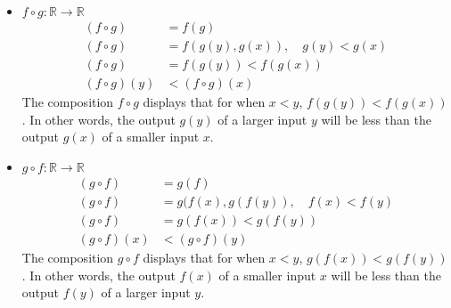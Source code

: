 \documentclass{article}
\begin{document}
\begin{itemize}
	\item $ f \circ g: \mathbb{R} \rightarrow \mathbb{R} $
	      \begin{align*}
		      \left( f \circ g \right)                  & = f(g)                                      \\
		      \left( f \circ g \right)                  & = f(g(y), g(x)), \quad g(y) < g(x)          \\
		      \left( f \circ g \right)                  & = f(g(y)) < f(g(x))                         \\
		      \left( f \circ g \right) \left( y \right) & < \left( f \circ g \right) \left( x \right)
	      \end{align*}
	      The composition $ f \circ g $ displays that for when $ x < y $, $ f(g(y)) < f(g(x)) $. In other words, the output $ g(y) $ of a larger input $ y $ will be less than the output $ g(x) $ of a smaller input $ x $.
	\item $ g \circ f: \mathbb{R} \rightarrow \mathbb{R} $
	      \begin{align*}
		      \left( g \circ f \right)                  & = g(f)                                      \\
		      \left( g \circ f \right)                  & = g(f(x), g(f(y)), \quad f(x) < f(y)        \\
		      \left( g \circ f \right)                  & = g(f(x)) < g(f(y))                         \\
		      \left( g \circ f \right) \left( x \right) & < \left( g \circ f \right) \left( y \right)
	      \end{align*}
	      The composition $ g \circ f $ displays that for when $ x < y $, $ g(f(x)) < g(f(y)) $. In other words, the output $ f(x) $ of a smaller input $ x $ will be less than the output $ f(y) $ of a larger input $ y $.
\end{itemize}
\end{document}
